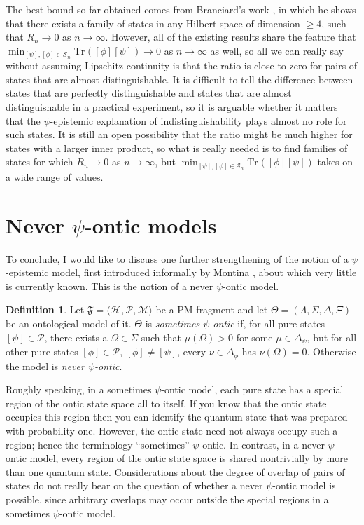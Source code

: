 \documentclass[DIV=calc,fontsize=12pt]{scrartcl} %
\theoremstyle{definition}
\newtheorem{definition}{Definition}[section]
\theoremstyle{plain}
\newcommand{\Proj}[1]{\ensuremath{\left [ #1 \right ]}}
\newcommand{\Hilb}[1][]{\ensuremath{\mathcal{H}_{#1}}}
\newcommand{\Tr}[2][]{\ensuremath{\text{Tr}_{#1} \left ( #2 \right )}}
\begin{document}
The best bound so far obtained comes from Branciard's work
\cite{Branciard2014}, in which he shows that there exists a family of
states in any Hilbert space of dimension $\geq 4$, such that $R_n
\rightarrow 0$ as $n \rightarrow \infty$.  However, all of the
existing results share the feature that $\min_{\Proj{\psi},\Proj{\phi}
\in \mathcal{S}_n} \Tr{\Proj{\phi}\Proj{\psi}} \rightarrow 0$ as $n
\rightarrow \infty$ as well, so all we can really say without assuming
Lipschitz continuity is that the ratio is close to zero for pairs of
states that are almost distinguishable.  It is difficult to tell the
difference between states that are perfectly distinguishable and
states that are almost distinguishable in a practical experiment, so
it is arguable whether it matters that the $\psi$-epistemic
explanation of indistinguishability plays almost no role for such
states.  It is still an open possibility that the ratio might be much
higher for states with a larger inner product, so what is really
needed is to find families of states for which $R_n \rightarrow 0$ as
$n \rightarrow \infty$, but $\min_{\Proj{\psi},\Proj{\phi} \in
\mathcal{S}_n}\Tr{\Proj{\phi}\Proj{\psi}}$ takes on a wide range of
values.

\section{Never $\psi$-ontic models}

\label{Never}

To conclude, I would like to discuss one further strengthening of the
notion of a $\psi$-epistemic model, first introduced informally by
Montina \cite{Montina2012a}, about which very little is currently
known.  This is the notion of a never $\psi$-ontic model.

\begin{definition}
Let $\mathfrak{F} = \langle \Hilb, \mathcal{P}, \mathcal{M} \rangle$
be a PM fragment and let $\Theta = (\Lambda, \Sigma, \Delta, \Xi)$ be
an ontological model of it.  $\Theta$ is \emph{sometimes $\psi$-ontic}
if, for all pure states $\Proj{\psi} \in \mathcal{P}$, there exists
a $\Omega \in \Sigma$ such that $\mu(\Omega) > 0$ for some $\mu \in
\Delta_{\psi}$, but for all other pure states $\Proj{\phi} \in
\mathcal{P}$, $\Proj{\phi} \neq \Proj{\psi}$, every $\nu \in
\Delta_{\phi}$ has $\nu(\Omega) = 0$.  Otherwise the model is
\emph{never $\psi$-ontic}.
\end{definition}

Roughly speaking, in a sometimes $\psi$-ontic model, each pure state
has a special region of the ontic state space all to itself.  If you
know that the ontic state occupies this region then you can identify
the quantum state that was prepared with probability one.  However,
the ontic state need not always occupy such a region; hence the
terminology ``sometimes'' $\psi$-ontic.  In contrast, in a never
$\psi$-ontic model, every region of the ontic state space is shared
nontrivially by more than one quantum state.  Considerations about the
degree of overlap of pairs of states do not really bear on the
question of whether a never $\psi$-ontic model is possible, since
arbitrary overlaps may occur outside the special regions in a
sometimes $\psi$-ontic model.
\end{document}
